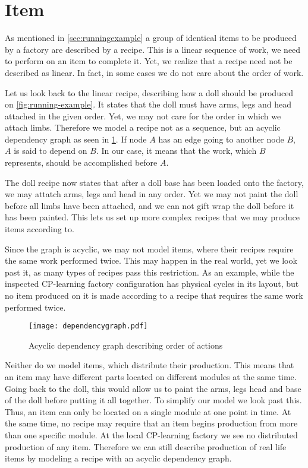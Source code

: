 \section{Item}\label{sec:recipe}
As mentioned in \cref{sec:runningexample} a group of identical items to be produced by a factory are described by a recipe. This is a linear sequence of work, we need to perform on an item to complete it. Yet, we realize that a recipe need not be described as linear. In fact, in some cases we do not care about the order of work. 

Let us look back to the linear recipe, describing how a doll should be produced on \cref{fig:running-example}. It states that the doll must have arms, legs and head attached in the given order. Yet, we may not care for the order in which we attach limbs. Therefore we model a recipe not as a sequence, but an acyclic dependency graph as seen in \cref{fig:dependency-graph}. If node $A$ has an edge going to another node $B$, $A$ is said to depend on $B$. In our case, it means that the work, which $B$ represents, should be accomplished before $A$. 

The doll recipe now states that after a doll base has been loaded onto the factory, we may attatch arms, legs and head in any order. Yet we may not paint the doll before all limbs have been attached, and we can not gift wrap the doll before it has been painted. This lets us set up more complex recipes that we may produce items according to. 

Since the graph is acyclic, we may not model items, where their recipes require the same work performed twice. This may happen in the real world, yet we look past it, as many types of recipes pass this restriction. As an example, while the inspected CP-learning factory configuration has physical cycles in its layout, but no item produced on it is made according to a recipe that requires the same work performed twice.  

\begin{figure}[H]
\centering
\texttt{[image: dependencygraph.pdf]}
\caption{Acyclic dependency graph describing order of actions}
\label{fig:dependency-graph}
\end{figure}

Neither do we model items, which distribute their production. This means that an item may have different parts located on different modules at the same time. Going back to the doll, this would allow us to paint the arms, legs head and base of the doll before putting it all together. To simplify our model we look past this. Thus, an item can only be located on a single module at one point in time. At the same time, no recipe may require that an item begins production from more than one specific module. At the local CP-learning factory we see no distributed production of any item. Therefore we can still describe production of real life items by modeling a recipe with an acyclic dependency graph.

